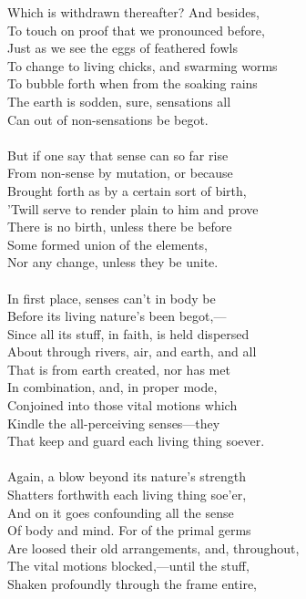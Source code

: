 Which is withdrawn thereafter? And besides,\\
To touch on proof that we pronounced before,\\
Just as we see the eggs of feathered fowls\\
To change to living chicks, and swarming worms\\
To bubble forth when from the soaking rains\\
The earth is sodden, sure, sensations all\\
Can out of non-sensations be begot.\\
\\
But if one say that sense can so far rise\\
From non-sense by mutation, or because\\
Brought forth as by a certain sort of birth,\\
'Twill serve to render plain to him and prove\\
There is no birth, unless there be before\\
Some formed union of the elements,\\
Nor any change, unless they be unite.\\
\\
In first place, senses can't in body be\\
Before its living nature's been begot,—\\
Since all its stuff, in faith, is held dispersed\\
About through rivers, air, and earth, and all\\
That is from earth created, nor has met\\
In combination, and, in proper mode,\\
Conjoined into those vital motions which\\
Kindle the all-perceiving senses—they\\
That keep and guard each living thing soever.\\
\\
Again, a blow beyond its nature's strength\\
Shatters forthwith each living thing soe'er,\\
And on it goes confounding all the sense\\
Of body and mind. For of the primal germs\\
Are loosed their old arrangements, and, throughout,\\
The vital motions blocked,—until the stuff,\\
Shaken profoundly through the frame entire,\\
